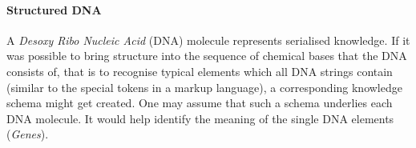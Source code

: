 %
%
%
%
%
%
%

\paragraph{Structured DNA}
\label{structured_dna_heading}

A \emph{Desoxy Ribo Nucleic Acid} (DNA) molecule represents serialised
knowledge. If it was possible to bring structure into the sequence of chemical
bases that the DNA consists of, that is to recognise typical elements which all
DNA strings contain (similar to the special tokens in a markup language), a
corresponding knowledge schema might get created. One may assume that such a
schema underlies each DNA molecule. It would help identify the meaning of the
single DNA elements (\emph{Genes}).
